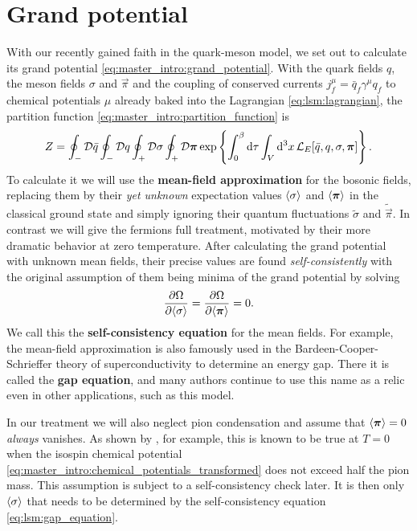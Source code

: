 \section{Grand potential}
\label{sec:lsm:grand_potential}

With our recently gained faith in the quark-meson model,
we set out to calculate its grand potential \eqref{eq:master_intro:grand_potential}.
With the quark fields $q$, the meson fields $\sigma$ and $\vec\pi$
and the coupling of conserved currents $j^\mu_f = \bar{q}_f \gamma^\mu q_f$ to chemical potentials $\mu$ already baked into the Lagrangian \eqref{eq:lsm:lagrangian},
the partition function \eqref{eq:master_intro:partition_function} is
\begin{equation}
	Z = \oint_- \mathcal{D} \bar{q} \oint_- \mathcal{D} q \oint_+ \mathcal{D} \sigma \oint_+ \mathcal{D} {\bm{\pi}} \exp \left\{ \int_0^\beta \mathop{}\!\mathrm{d} \tau \int_V \mathop{}\!\mathrm{d}^3 x \, \mathcal{L}_E[\bar{q}, q, \sigma, {\bm{\pi}}]  \right\} .
\label{eq:lsm:partition_function_initial}
\end{equation}
To calculate it we will use the \textbf{mean-field approximation} for the bosonic fields,
replacing them by their \emph{yet unknown} expectation values $\langle \sigma \rangle$ and $\langle {\bm{\pi}} \rangle$ in the classical ground state
and simply ignoring their quantum fluctuations $\tilde{\sigma}$ and $\tilde{\vec\pi}$.
In contrast we will give the fermions full treatment,
motivated by their more dramatic behavior at zero temperature.
After calculating the grand potential with unknown mean fields,
their precise values are found \emph{self-consistently} with the original assumption of them being minima of the grand potential by solving
\begin{equation}
	\pdv{\Omega}{ \langle \sigma \rangle} = \pdv{\Omega}{ \langle {\bm{\pi}} \rangle} = 0.
\label{eq:lsm:gap_equation}
\end{equation}
We call this the \textbf{self-consistency equation} for the mean fields.
For example, the mean-field approximation is also famously used in the Bardeen-Cooper-Schrieffer theory of superconductivity to determine an energy gap.
There it is called the \textbf{gap equation}, 
and many authors continue to use this name as a relic even in other applications, such as this model.

In our treatment we will also neglect pion condensation and assume that $\langle {\bm{\pi}} \rangle=0$ \emph{always} vanishes.
As shown by \cite{ref:jo_lsm_pion_condensation,ref:jo_lsm_consistent}, for example,
this is known to be true at $T=0$ when the isospin chemical potential \eqref{eq:master_intro:chemical_potentials_transformed} does not exceed half the pion mass.
This assumption is subject to a self-consistency check later.
It is then only $\langle \sigma \rangle$ that needs to be determined by the self-consistency equation \eqref{eq:lsm:gap_equation}.

